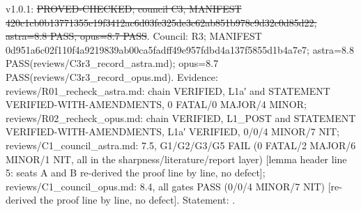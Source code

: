 \begin{lemma}\label{reg:W3-POST_Lemma-1a_}
\end{lemma}
\begin{statusbox}
 v1.0.1: \st{PROVED-CHECKED; council C3, MANIFEST 420c1cb0b13771355c19f3412ac6d03fe325de3c62ab851b978c9d32c0d85d22, astra=8.8 PASS, opus=8.7 PASS}. Council: R3; MANIFEST 0d951a6c02f110f4a9219839ab00ca5fadff49e957fdbd4a137f5855d1b4a7e7; astra=8.8 PASS(reviews/C3r3\_record\_astra.md); opus=8.7 PASS(reviews/C3r3\_record\_opus.md). Evidence: reviews/R01\_recheck\_astra.md: chain VERIFIED, L1a′ and STATEMENT VERIFIED-WITH-AMENDMENTS, 0 FATAL/0 MAJOR/4 MINOR; reviews/R02\_recheck\_opus.md: chain VERIFIED, L1\_POST and STATEMENT VERIFIED-WITH-AMENDMENTS, L1a′ VERIFIED, 0/0/4 MINOR/7 NIT; reviews/C1\_council\_astra.md: 7.5, G1/G2/G3/G5 FAIL (0 FATAL/2 MAJOR/6 MINOR/1 NIT, all in the sharpness/literature/report layer) [lemma header line 5: seats A and B re-derived the proof line by line, no defect]; reviews/C1\_council\_opus.md: 8.4, all gates PASS (0/0/4 MINOR/7 NIT) [re-derived the proof line by line, no defect]. Statement: .
\end{statusbox}
